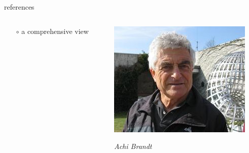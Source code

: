 \documentclass[10pt,
               svgnames,
               hyperref={colorlinks,citecolor=DeepPink4,linkcolor=FireBrick,urlcolor=Maroon},
               usepdftitle=false]{beamer}
\begin{document}
\begin{frame}{references}
\begin{columns}
\begin{column}{0.8\textwidth}
\begin{itemize}
    \begin{itemize}
    \item[$\circ$] a comprehensive view
    \end{itemize}
\end{itemize}
\end{column}
\begin{column}{0.17\textwidth}
\hfill \includegraphics[width=\textwidth]{images/abrandt.jpg}

\hfill {\scriptsize \emph{Achi Brandt}}


\end{column}
\end{columns}
\end{frame}
\end{document}
